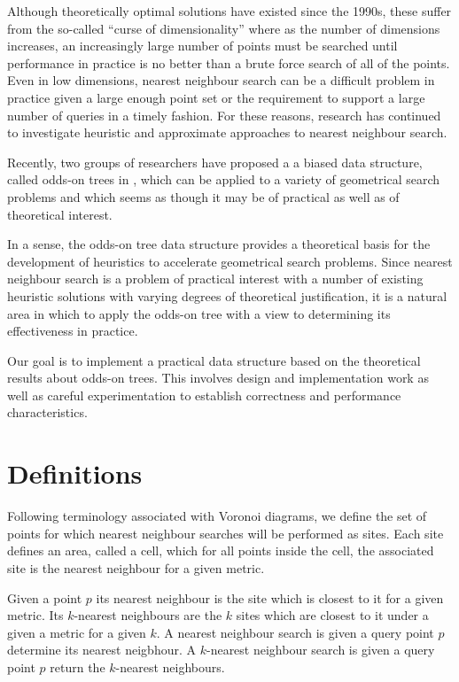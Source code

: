 \documentclass[mcs]{scsthesis}
\begin{document}
Although theoretically optimal solutions have existed since the 1990s, these
suffer from the so-called ``curse of dimensionality'' where as the number of
dimensions increases, an increasingly large number of points must be searched
until performance in practice is no better than a brute force search of all of
the points. Even in low dimensions, nearest neighbour search can be a difficult
problem in practice given a large enough point set or the requirement to support
a large number of queries in a timely fashion. For these reasons, research has
continued to investigate heuristic and approximate approaches to nearest
neighbour search. 
 
Recently, two groups of researchers \cite{oddson,chan} have proposed a
a biased data structure, called odds-on trees in \cite{oddson},  which can be
applied to a variety of geometrical search problems and which seems as though it
may be of practical as well as of theoretical interest.

In a sense, the odds-on tree data structure provides a theoretical basis for
the development of heuristics to accelerate geometrical search problems. Since
nearest neighbour search is a problem of practical interest with a number of
existing heuristic solutions with varying degrees of theoretical justification,
it is a natural area in which to apply the odds-on tree with a view to
determining its effectiveness in practice.

Our goal is to implement a practical data structure based on the theoretical
results about odds-on trees.  This involves design and implementation work as
well as careful experimentation to establish correctness and performance
characteristics.

\section{Definitions}

Following terminology associated with Voronoi diagrams, we define the set of
points for which nearest neighbour searches will be performed as sites. Each
site defines an area, called a cell, which for all points inside the cell, the
associated site is the nearest neighbour for a given metric.

Given a point \(p\) its nearest neighbour is the site which is closest to it
for a given metric. Its $k$-nearest neighbours are the $k$ sites which are
closest to it under a given a metric for a given $k$.  A nearest neighbour
search is given a query point \(p\) determine its nearest neigbhour.
A \(k\)-nearest neighbour search is given a query point \(p\) return the
$k$-nearest neighbours.
\end{document}
